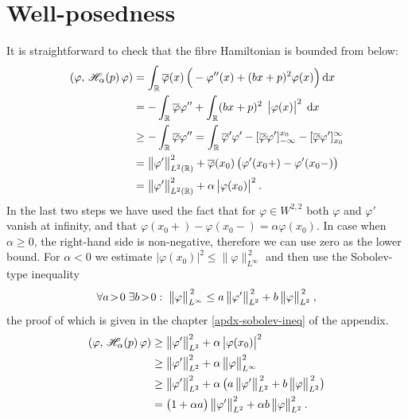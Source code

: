 \section{Well-posedness} \label{section-dirac-well-posedness}
It is straightforward to check that the fibre Hamiltonian is bounded from below:
\begin{align*}
    (\varphi, \, \mathscr{H}_\alpha(p) \, \varphi)
    &= \int_{\mathbb{R}} \overline{\varphi}(x) \, \Big( -\varphi''(x) + (b x + p)^2 \varphi(x) \Big) \, \mathrm{d}x \,
    \\
    &= -\int_{\mathbb{R}} \overline{\varphi} \varphi''
    + \int_{\mathbb{R}} (b x + p)^2 \;\, \big|\varphi(x)\big|^2 \; \, \mathrm{d}x \,
    \\
    &\geq -\int_{\mathbb{R}} \overline{\varphi} \varphi''
    = \int_{\mathbb{R}} \overline{\varphi}' \varphi'
    - [\overline{\varphi}\varphi']_{-\infty}^{x_0}
    - [\overline{\varphi}\varphi']_{x_0}^{\infty}
    \\
    &= \big\lVert \varphi' \big\rVert_{L^2(\mathbb{R})}^2
    + \overline{\varphi}(x_0)
    \, \big( \varphi'(x_0+) - \varphi'(x_0-) \big)
    \\
    &= \big\lVert \varphi' \big\rVert_{L^2(\mathbb{R})}^2
    + \alpha \, \big|\varphi(x_0)\big|^2
    \: .
\end{align*}
In the last two steps we have used the fact that for $\varphi \in W^{2,2}$ both $\varphi$ and $\varphi'$ vanish at infinity, and that $\varphi(x_0+)-\varphi(x_0-) = \alpha \varphi(x_0)$. In case when $\alpha\geq0$, the right-hand side is non-negative, therefore we can use zero as the lower bound. For $\alpha<0$ we estimate $|\varphi(x_0)|^2 \leq \lVert\varphi\rVert_{L^\infty}^{\,2}$ and then use the Sobolev-type inequality
\begin{equation*}
    \forall a\!>\!0 \; \exists b\!>\!0: \; \big\lVert \varphi \big\rVert_{L^\infty}^{\,2} \leq a \, \big\lVert \varphi' \big\rVert_{L^2}^{\,2} + b \, \big\lVert \varphi \big\rVert_{L^2}^{\,2} \:,
\end{equation*}
the proof of which is given in the chapter \ref{apdx-sobolev-ineq} of the appendix.
\begin{align*}
    (\varphi, \, \mathscr{H}_\alpha(p) \, \varphi)
    &\geq \big\lVert \varphi' \big\rVert_{L^2}^2
    + \alpha \, \big|\varphi(x_0)\big|^2
    \\
    &\geq \big\lVert \varphi' \big\rVert_{L^2}^2
    + \alpha \, \big\lVert \varphi \big\rVert_{L^\infty}^2
    \\
    &\geq \big\lVert \varphi' \big\rVert_{L^2}^2
    + \alpha \, \big(
        a \, \big\lVert \varphi' \big\rVert_{L^2}^{\,2} + b \, \big\lVert \varphi \big\rVert_{L^2}^{\,2}
    \big)
    \\
    &= \big( 1 + \alpha a \big) \, \big\lVert \varphi' \big\rVert_{L^2}^2
    +\alpha b \, \big\lVert \varphi \big\rVert_{L^2}^2
    \: .
\end{align*}
